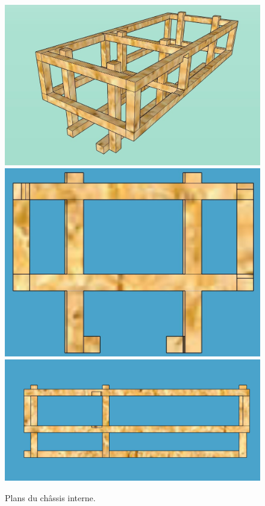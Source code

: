 \documentclass[11pt,a4paper]{article}
\begin{document}
        \begin{figure}[H]
          \centering
          \includegraphics[scale=0.25]{ROVChassisGlobal.jpg}
          \includegraphics[scale=0.25]{ROVChassisFace.jpg}
          \includegraphics[scale=0.25]{ROVChassisGauche.jpg}
          \caption{Plans du châssis interne.}
          \label{figChassis}
        \end{figure}
\end{document}
